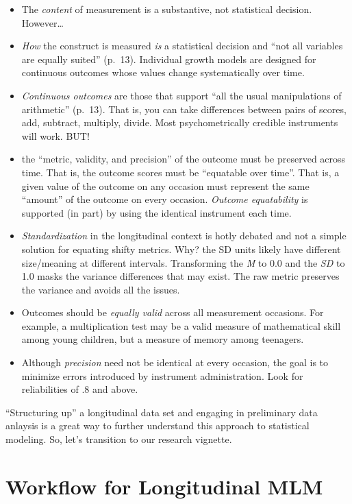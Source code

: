 \documentclass[
  11pt,
]{book}
\providecommand{\tightlist}{%
  \setlength{\itemsep}{0pt}\setlength{\parskip}{0pt}}
\begin{document}
\begin{enumerate}
  \begin{itemize}
  \tightlist
  \item
    The \emph{content} of measurement is a substantive, not statistical decision. However\ldots{}
  \item
    \emph{How} the construct is measured \emph{is} a statistical decision and ``not all variables are equally suited'' (p.~13). Individual growth models are designed for continuous outcomes whose values change systematically over time.
  \item
    \emph{Continuous outcomes} are those that support ``all the usual manipulations of arithmetic'' (p.~13). That is, you can take differences between pairs of scores, add, subtract, multiply, divide. Most psychometrically credible instruments will work. BUT!
  \item
    the ``metric, validity, and precision'' of the outcome must be preserved across time. That is, the outcome scores must be ``equatable over time''. That is, a given value of the outcome on any occasion must represent the same ``amount'' of the outcome on every occasion. \emph{Outcome equatability} is supported (in part) by using the identical instrument each time.
  \item
    \emph{Standardization} in the longitudinal context is hotly debated and not a simple solution for equating shifty metrics. Why? the SD units likely have different size/meaning at different intervals. Transforming the \emph{M} to 0.0 and the \emph{SD} to 1.0 masks the variance differences that may exist. The raw metric preserves the variance and avoids all the issues.
  \item
    Outcomes should be \emph{equally valid} across all measurement occasions. For example, a multiplication test may be a valid measure of mathematical skill among young children, but a measure of memory among teenagers.
  \item
    Although \emph{precision} need not be identical at every occasion, the goal is to minimize errors introduced by instrument administration. Look for reliabilities of .8 and above.
  \end{itemize}
\end{enumerate}

``Structuring up'' a longitudinal data set and engaging in preliminary data anlaysis is a great way to further understand this approach to statistical modeling. So, let's transition to our research vignette.

\hypertarget{workflow-for-longitudinal-mlm}{%
\section{Workflow for Longitudinal MLM}\label{workflow-for-longitudinal-mlm}}
\end{document}
